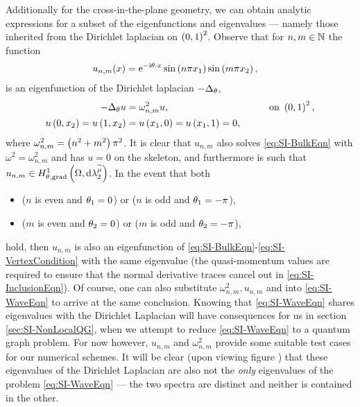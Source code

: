 Additionally for the cross-in-the-plane geometry, we can obtain analytic expressions for a subset of the eigenfunctions and eigenvalues --- namely those inherited from the Dirichlet laplacian on $\left( 0,1 \right)^2$.
Observe that for $n,m\in\mathbb{N}$ the function
\begin{align*}
	u_{n,m}(x) &= \mathrm{e}^{-\mathrm{i}\theta\cdot x}\sin\left( n\pi x_1 \right)\sin\left( m\pi x_2 \right),
\end{align*}
is an eigenfunction of the Dirichlet laplacian $-\Delta_{\theta}$,
\begin{align*}
	-\Delta_{\theta}u &= \omega_{n,m}^2 u, &\qquad \text{on } \left( 0,1 \right)^2, \\
	u\left( 0,x_2 \right) = u\left( 1,x_2 \right) &= u\left( x_1,0 \right) = u\left( x_1,1 \right) = 0,
\end{align*}
where $\omega_{n,m}^2 = \left( n^2+m^2 \right)\pi^2$.
It is clear that $u_{n,m}$ also solves \eqref{eq:SI-BulkEqn} with $\omega^2 = \omega_{n,m}^2$ and has $u=0$ on the skeleton, and furthermore is such that $u_{n,m}\in H^1_{\theta, \mathrm{grad}}\left( \Omega, \mathrm{d}\lambda_2^{\widetilde{\mu}} \right)$.
In the event that both
\begin{itemize}
	\item ($n$ is even and $\theta_1=0$) or ($n$ is odd and $\theta_1=-\pi$),
	\item ($m$ is even and $\theta_2=0$) or ($m$ is odd and $\theta_2=-\pi$),
\end{itemize}
hold, then $u_{n,m}$ is also an eigenfunction of \eqref{eq:SI-BulkEqn}-\eqref{eq:SI-VertexCondition} with the same eigenvalue (the quasi-momentum values are required to ensure that the normal derivative traces cancel out in \eqref{eq:SI-InclusionEqn}).
Of course, one can also substitute $\omega^2_{n,m}, u_{n,m}$ and into \eqref{eq:SI-WaveEqn} to arrive at the same conclusion.
Knowing that \eqref{eq:SI-WaveEqn} shares eigenvalues with the Dirichlet Laplacian will have consequences for us in section \ref{sec:SI-NonLocalQG}, when we attempt to reduce \eqref{eq:SI-WaveEqn} to a quantum graph problem.
For now however, $u_{n,m}$ and $\omega_{n,m}^2$ provide some suitable test cases for our numerical schemes.
It will be clear (upon viewing figure ) that these eigenvalues of the Dirichlet Laplacian are also not the \emph{only} eigenvalues of the problem \eqref{eq:SI-WaveEqn} --- the two spectra are distinct and neither is contained in the other.